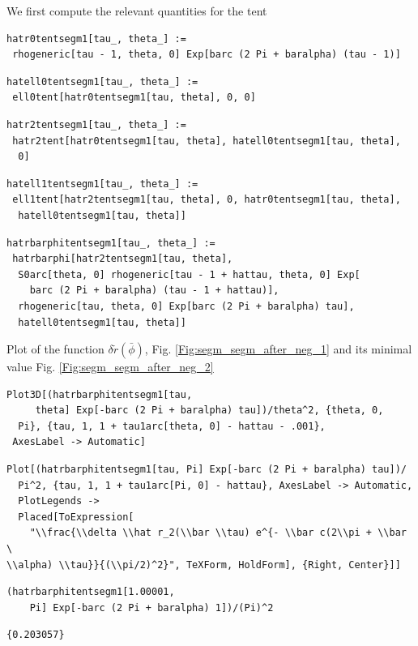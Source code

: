 \documentclass[reqno]{amsart}
\theoremstyle{definition} \newtheorem{definition}{Definition}[section]
\theoremstyle{definition} \newtheorem{remark}[definition]{Remark}
\theoremstyle{plain} \newtheorem{lemma}[definition]{Lemma}
\theoremstyle{plain} \newtheorem{proposition}[definition]{Proposition}
\theoremstyle{plain} \newtheorem{theorem}[definition]{Theorem}
\theoremstyle{plain} \newtheorem{corollary}[definition]{Corollary}
\theoremstyle{definition} \newtheorem{example}[definition]{Example}
\theoremstyle{plain} \newtheorem{claim}[clai]{Claim}
\theoremstyle{definition} \newtheorem{assumption}[definition]{Assumption}
\theoremstyle{definition} \newtheorem{observation}[definition]{Observation}
\newcommand{\1}{\mathbbm 1}
\newcommand{\smed}{\medskip}
\newcommand{\sbig}{\bigskip}
\numberwithin{equation}{section} %
\theoremstyle{plain} \newtheorem*{theorem*}{Theorem}
\theoremstyle{plain} \newtheorem{mthm}[maintheorem]{Main Theorem}
\theoremstyle{plain} \newtheorem*{mthm*}{Main Theorem}
\theoremstyle{plain} \newtheorem*{conjecture*}{Conjecture}
\theoremstyle{plain} \newtheorem{conjecture}[definition]{Conjecture}
\theoremstyle{plain} \newtheorem*{problem*}{Problem}
\begin{document}
\sbig


\sbig

\noindent We first compute the relevant quantities for the tent
\smed
\begin{verbatim}
hatr0tentsegm1[tau_, theta_] := 
 rhogeneric[tau - 1, theta, 0] Exp[barc (2 Pi + baralpha) (tau - 1)]
\end{verbatim}
\begin{verbatim}
hatell0tentsegm1[tau_, theta_] := 
 ell0tent[hatr0tentsegm1[tau, theta], 0, 0]
\end{verbatim}
\begin{verbatim}
hatr2tentsegm1[tau_, theta_] := 
 hatr2tent[hatr0tentsegm1[tau, theta], hatell0tentsegm1[tau, theta], 
  0]
\end{verbatim}
\begin{verbatim}
hatell1tentsegm1[tau_, theta_] := 
 ell1tent[hatr2tentsegm1[tau, theta], 0, hatr0tentsegm1[tau, theta], 
  hatell0tentsegm1[tau, theta]]
\end{verbatim}
\begin{verbatim}
hatrbarphitentsegm1[tau_, theta_] := 
 hatrbarphi[hatr2tentsegm1[tau, theta], 
  S0arc[theta, 0] rhogeneric[tau - 1 + hattau, theta, 0] Exp[
    barc (2 Pi + baralpha) (tau - 1 + hattau)], 
  rhogeneric[tau, theta, 0] Exp[barc (2 Pi + baralpha) tau], 
  hatell0tentsegm1[tau, theta]]
\end{verbatim}
\smed
Plot of the function $\delta \check r(\bar \phi)$, Fig. \ref{Fig:segm_segm_after_neg_1} and its minimal value Fig. \ref{Fig:segm_segm_after_neg_2}
\smed
\begin{verbatim}
Plot3D[(hatrbarphitentsegm1[tau, 
     theta] Exp[-barc (2 Pi + baralpha) tau])/theta^2, {theta, 0, 
  Pi}, {tau, 1, 1 + tau1arc[theta, 0] - hattau - .001}, 
 AxesLabel -> Automatic]
\end{verbatim}
\begin{verbatim}
Plot[(hatrbarphitentsegm1[tau, Pi] Exp[-barc (2 Pi + baralpha) tau])/
  Pi^2, {tau, 1, 1 + tau1arc[Pi, 0] - hattau}, AxesLabel -> Automatic,
  PlotLegends -> 
  Placed[ToExpression[
    "\\frac{\\delta \\hat r_2(\\bar \\tau) e^{- \\bar c(2\\pi + \\bar \
\\alpha) \\tau}}{(\\pi/2)^2}", TeXForm, HoldForm], {Right, Center}]]
\end{verbatim}
\begin{verbatim}
(hatrbarphitentsegm1[1.00001, 
    Pi] Exp[-barc (2 Pi + baralpha) 1])/(Pi)^2
\end{verbatim}
\begin{verbatim}
{0.203057}
\end{verbatim}
\end{document}

